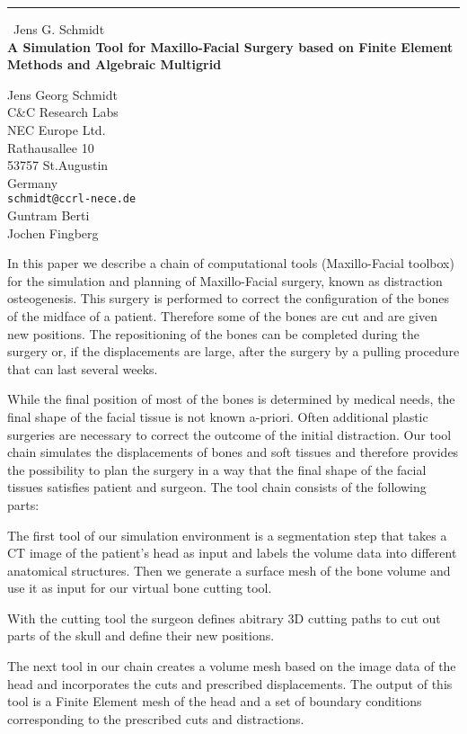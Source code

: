 \documentclass{report}
\begin{document}
\begin{center}
\rule{6in}{1pt} \
{\large Jens G. Schmidt \\
{\bf A Simulation Tool for Maxillo-Facial Surgery based on Finite Element Methods and Algebraic Multigrid}}

Jens Georg Schmidt \\ C&C Research Labs \\ NEC Europe Ltd. \\ Rathausallee 10 \\ 53757 St.Augustin \\ Germany
\\
{\tt schmidt@ccrl-nece.de}\\
Guntram Berti\\
Jochen Fingberg\end{center}


In this paper we describe a chain of computational tools (Maxillo-Facial
toolbox) for the simulation and planning of Maxillo-Facial surgery, known
as distraction osteogenesis. This surgery is performed to correct the
configuration of the bones of the midface of a patient. Therefore some of
the bones are cut and are given new positions. The repositioning of the
bones can be completed during the surgery or, if the displacements are
large, after the surgery by a pulling procedure that can last several
weeks.

While the final position of most of the bones is determined by medical
needs, the final shape of the facial tissue is not known a-priori. Often
additional plastic surgeries are necessary to correct the outcome of the
initial distraction. Our tool chain simulates the displacements of bones
and soft tissues and therefore provides the possibility to plan the
surgery in a way that the final shape of the facial tissues satisfies
patient and surgeon. The tool chain consists of the following parts:

The first tool of our simulation environment is a segmentation step that
takes a CT image of the patient's head as input and labels the volume
data into different anatomical structures. Then we generate a surface
mesh of the bone volume and use it as input for our virtual bone cutting
tool.

With the cutting tool the surgeon defines abitrary 3D cutting paths to
cut out parts of the skull and define their new positions.

The next tool in our chain creates a volume mesh based on the image data
of the head and incorporates the cuts and prescribed displacements. The
output of this tool is a Finite Element mesh of the head and a set of
boundary conditions corresponding to the prescribed cuts and
distractions.
\end{document}
